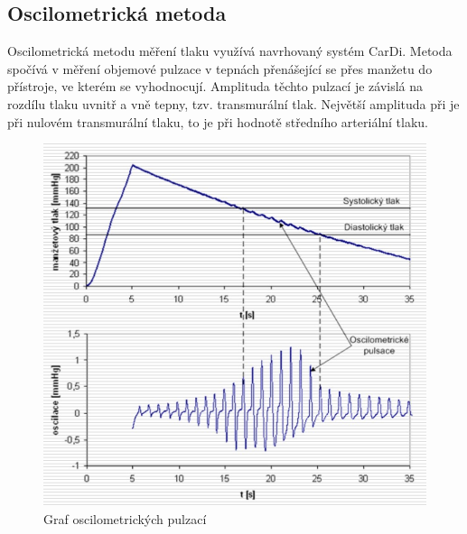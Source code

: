\subsection{Oscilometrická metoda}
Oscilometrická metodu měření tlaku využívá navrhovaný systém CarDi. Metoda spočívá v měření objemové pulzace v tepnách přenášející se přes manžetu do přístroje, ve kterém se vyhodnocují.
Amplituda těchto pulzací je závislá na rozdílu tlaku uvnitř a vně tepny, tzv. transmurální tlak. Největší amplituda při je při nulovém transmurální tlaku, to je při hodnotě středního arteriální tlaku.
\cite{cite:Fabian}
\begin{figure}[H]
    \caption{Graf oscilometrických pulzací \cite{cite:Fabian}}
    \includegraphics[width=1\textwidth]{pictures/oscilometricky_tlak.jpg}
\end{figure}
\raggedbottom
